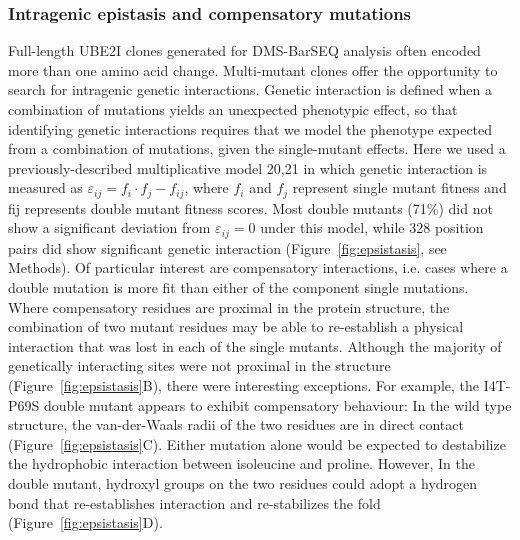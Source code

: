 \subsubsection{Intragenic epistasis and compensatory mutations}

Full-length UBE2I clones generated for DMS-BarSEQ analysis often encoded more than one amino acid change. Multi-mutant clones offer the opportunity to search for intragenic genetic interactions. Genetic interaction is defined when a combination of mutations yields an unexpected phenotypic effect, so that identifying genetic interactions requires that we model the phenotype expected from a combination of mutations, given the single-mutant effects.  Here we used a previously-described multiplicative model 20,21 in which genetic interaction is measured as $\varepsilon_{ij} = f_i \cdot f_j - f_{ij}$, where $f_i$ and $f_j$ represent single mutant fitness and fij represents double mutant fitness scores. Most double mutants (71\%) did not show a significant deviation from $\varepsilon_{ij} = 0$ under this model, while 328 position pairs did show significant genetic interaction (Figure~\ref{fig:epsistasis}, see Methods). Of particular interest are compensatory interactions, i.e. cases where a double mutation is more fit than either of the component single mutations.  Where compensatory residues are proximal in the protein structure, the combination of two mutant residues may be able to re-establish a physical interaction that was lost in each of the single mutants. Although the majority of genetically interacting sites were not proximal in the structure (Figure~\ref{fig:epsistasis}B), there were interesting exceptions. For example, the I4T-P69S double mutant appears to exhibit compensatory behaviour: In the wild type structure, the van-der-Waals radii of the two residues are in direct contact (Figure~\ref{fig:epsistasis}C). Either mutation alone would be expected to destabilize the hydrophobic interaction between isoleucine and proline.  However, In the double mutant, hydroxyl groups on the two residues could adopt a hydrogen bond that re-establishes interaction and re-stabilizes the fold (Figure~\ref{fig:epsistasis}D).


